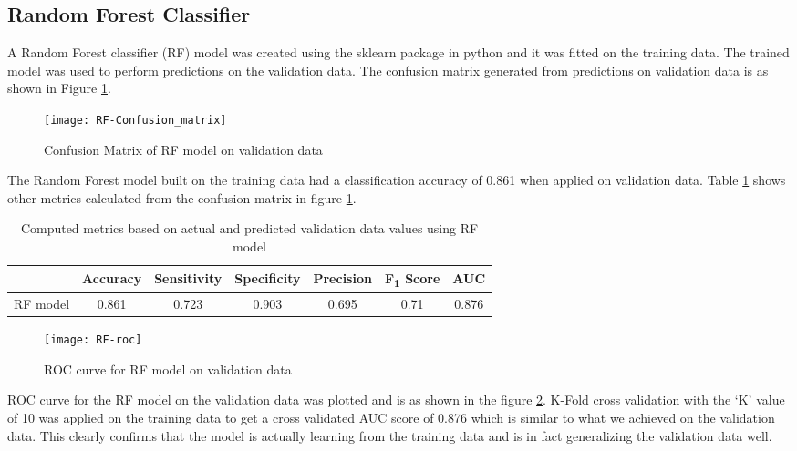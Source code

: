 \documentclass[11pt,openright]{report}
\begin{document}
\subsection {Random Forest Classifier}
A Random Forest classifier (RF) model was created using the sklearn package in python and it was fitted on the training data. The trained model was used to perform predictions on the validation data. The confusion matrix generated from predictions on validation data is as shown in Figure \ref{fig:RF_confusion_matrix}.

  \begin{figure}[!htb]
	\centering
	\texttt{[image: RF-Confusion\_matrix]}
	\caption{Confusion Matrix of RF model on validation data}
	\label{fig:RF_confusion_matrix}
\end{figure} 

The Random Forest model built on the training data had a classification accuracy of 0.861 when applied on validation data. Table \ref{table:RF_confusion_matrix} shows other metrics calculated from the confusion matrix in figure \ref{fig:RF_confusion_matrix}. 
\begin{table}[!htb]
	\renewcommand{\arraystretch}{1.3}
	\caption{Computed metrics based on actual and predicted validation data values using RF model}
	\label{table:RF_confusion_matrix}
	\centering
	\begin{tabular}{|c|c|c|c|c|c|c|}
    \hline
  	 & \bfseries Accuracy & \bfseries Sensitivity & \bfseries Specificity & \bfseries Precision & \bfseries F\textsubscript{1} Score  & \bfseries AUC\\  
    \hline
	RF model & 0.861 & 0.723 & 0.903 & 0.695 & 0.71 & 0.876 \\ \hline
	\end{tabular} 
\end{table}

 \begin{figure}[!htb]
	\centering
	\texttt{[image: RF-roc]}
	\caption{ROC curve for RF model on validation data}
	\label{fig:RF_roc}
\end{figure} 

ROC curve for the RF model on the validation data was plotted and is as shown in the figure \ref{fig:RF_roc}. K-Fold cross validation with the `K' value of 10 was applied on the training data to get a cross validated AUC score of 0.876 which is similar to what we achieved on the validation data. This clearly confirms that the model is actually learning from the training data and is in fact generalizing the validation data well.
\end{document}
